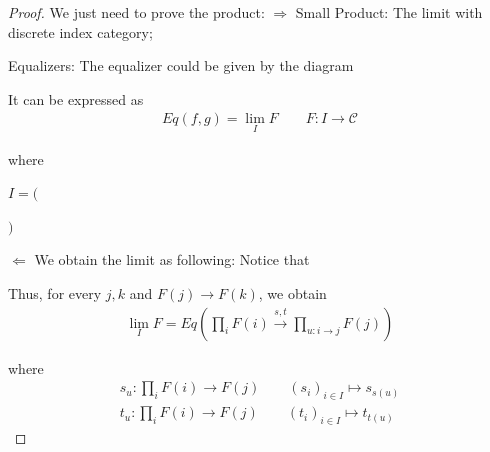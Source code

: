 \documentclass[Total.tex]{subfiles}
\begin{document}
				\begin{proof}
					We just need to prove the product: 
					$\Rightarrow$ Small Product: The limit with discrete index category;
					
					Equalizers: The equalizer could be given by the diagram
					\begin{center}
					\end{center}
					
					It can be expressed as 
					\begin{gather*}
						Eq(f,g)=\lim_I F\qquad F:I\rightarrow \mathcal{C}
					\end{gather*}
					
					where 
					\begin{center}
						$I=($$)$
					\end{center}
					
					\begin{center}
					\end{center}
					
					$\Leftarrow$ We obtain the limit as following: Notice that
					\begin{center}
					\end{center}
					
					Thus, for every $j,k$ and $F(j)\rightarrow F(k)$, we obtain 
					\begin{gather*}
						\lim_I F=Eq(\prod_{i} F(i)\stackrel{s,t}{\rightarrow} \prod_{u:i\rightarrow j} F(j))
					\end{gather*}
					
					where
					\begin{gather*}
						s_u:\prod_i F(i)\rightarrow F(j)\qquad (s_i)_{i\in I}\mapsto s_{s(u)}\\
						t_u:\prod_i F(i)\rightarrow F(j)\qquad (t_i)_{i\in I}\mapsto t_{t(u)}
					\end{gather*}
				\end{proof}
				
\end{document}
